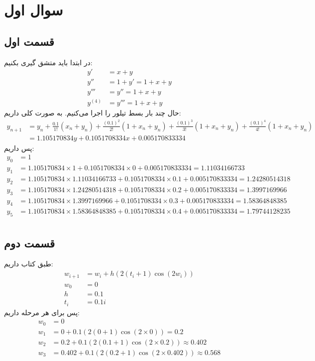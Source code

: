 \documentclass[]{article}
\begin{document}
\printheader

\section*{سوال اول}
\subsection*{قسمت اول}
در ابتدا باید متشق گیری بکنیم:
\begin{align*}
    y' &= x + y\\
    y'' &= 1 + y' = 1 + x + y\\
    y''' &= y'' = 1 + x + y\\
    y^{(4)} &= y''' = 1 + x + y
\end{align*}
حال چند بار بسط تیلور را اجرا می‌کنیم. به صورت کلی داریم:
\begin{align*}
    y_{n+1} &= y_n + \frac{0.1}{1!}(x_n + y_n) + \frac{(0.1)^2}{2!} (1 + x_n + y_n) + \frac{(0.1)^3}{3!} (1 + x_n + y_n) + \frac{(0.1)^4}{4!} (1 + x_n + y_n)\\
    &= 1.105170834 y + 0.1051708334 x + 0.005170833334
\end{align*}
پس داریم:
\begin{align*}
    y_0 &= 1\\
    y_1 &= 1.105170834 \times 1 + 0.1051708334 \times 0 + 0.005170833334 = 1.11034166733\\
    y_2 &= 1.105170834 \times 1.11034166733 + 0.1051708334 \times 0.1 + 0.005170833334 = 1.24280514318\\
    y_3 &= 1.105170834 \times 1.24280514318 + 0.1051708334 \times 0.2 + 0.005170833334 = 1.3997169966\\
    y_4 &= 1.105170834 \times 1.3997169966 + 0.1051708334 \times 0.3 + 0.005170833334 = 1.58364848385\\
    y_5 &= 1.105170834 \times 1.58364848385 + 0.1051708334 \times 0.4 + 0.005170833334 = \boxed{1.79744128235}\\
\end{align*}
\subsection*{قسمت دوم}
طبق کتاب داریم:
\begin{align*}
    w_{i+1} &= w_i + h\left(2\left(t_i + 1\right) \cos \left(2w_i\right)\right)\\
    w_0 &= 0\\
    h &= 0.1\\
    t_i &= 0.1i
\end{align*}
پس برای هر مرحله داریم:
\begin{align*}
    w_0 &= 0\\
    w_1 &= 0 + 0.1\left(2\left(0 + 1\right) \cos \left(2\times0\right)\right) = 0.2\\
    w_2 &= 0.2 + 0.1\left(2\left(0.1 + 1\right) \cos \left(2\times 0.2\right)\right) \approx 0.402\\
    w_3 &= 0.402 + 0.1\left(2\left(0.2 + 1\right) \cos \left(2\times 0.402\right)\right) \approx \boxed{0.568}
\end{align*}
\end{document}
